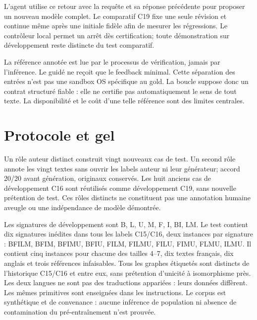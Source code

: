 \documentclass[11pt]{article}
\begin{document}
L'agent utilise ce retour avec la requête et sa réponse précédente pour proposer un nouveau modèle complet. Le comparatif C19 fixe une seule révision et continue même après une initiale fidèle afin de mesurer les régressions. Le contrôleur local permet un arrêt dès certification; toute démonstration sur développement reste distincte du test comparatif.

La référence annotée est lue par le processus de vérification, jamais par l'inférence. Le guidé ne reçoit que le feedback minimal. Cette séparation des entrées n'est pas une sandbox OS spécifique au gold. La boucle suppose donc un contrat structuré fiable : elle ne certifie pas automatiquement le sens de tout texte. La disponibilité et le coût d'une telle référence sont des limites centrales.

\section{Protocole et gel}

Un rôle auteur distinct construit vingt nouveaux cas de test. Un second rôle annote les vingt textes sans ouvrir les labels auteur ni leur générateur; accord 20/20 avant génération, originaux conservés. Les huit anciens cas de développement C16 sont réutilisés comme développement C19, sans nouvelle prétention de test. Ces rôles distincts ne constituent pas une annotation humaine aveugle ou une indépendance de modèle démontrée.

Les signatures de développement sont B, L, U, M, F, I, BI, LM. Le test contient dix signatures inédites dans tous les labels C15/C16, deux instances par signature : BFILM, BFIM, BFIMU, BFIU, FILM, FILMU, FILU, FIMU, FLMU, ILMU. Il contient cinq instances pour chacune des tailles 4–7, dix textes français, dix anglais et trois références infaisables. Tous les graphes étiquetés sont distincts de l’historique C15/C16 et entre eux, sans prétention d’unicité à isomorphisme près. Les deux langues ne sont pas des traductions appariées : leurs données diffèrent. Les mêmes primitives sont enseignées dans les instructions. Le corpus est synthétique et de convenance : aucune inférence de population ni absence de contamination du pré-entraînement n'est prouvée.
\end{document}
